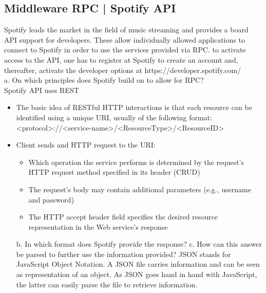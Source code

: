 \documentclass{article}
\begin{document}
\subsection{Middleware RPC | Spotify API}
Spotify leads the market in the field of music streaming and provides a board API support for developers. These allow individually allowed applications to connect to Spotify in order to use the services provided via RPC. to activate access to the API, one has to register at Spotify to create an account and, thereafter, activate the developer options at https://developer.spotify.com/\\
a. On which principles does Spotify build on to allow for RPC?\\
Spotify API uses REST
\begin{itemize}
    \item The basic idea of RESTful HTTP interactions is that each resource can be identified using a unique URI, usually of the following format: <protocol>://<service-name>/<ResourceType>/<ResourceID>
    \item Client sends and HTTP request to the URI:
          \begin{itemize}
              \item Which operation the service performs is determined by the request's HTTP request method specified in its header (CRUD)
              \item The request's body may contain additional parameters (e.g., username and password)
              \item The HTTP accept header field specifies the desired resource representation in the Web service's response
          \end{itemize}
          b. In which format does Spotify provide the response?
          c. How can this answer be parsed to further use the information provided?
          JSON stands for JavaScript Object Notation. A JSON file carries information and can be seen as representation of an object. As JSON goes hand in hand with JavaScript, the latter can easily parse the file to retrieve information.
\end{itemize}
\end{document}
